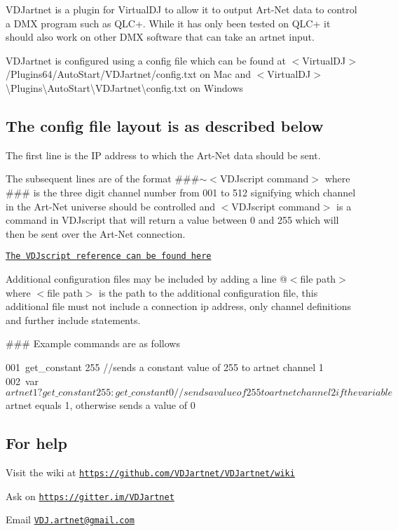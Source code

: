 V\+D\+Jartnet is a plugin for Virtual\+DJ to allow it to output Art-\/\+Net data to control a D\+MX program such as Q\+L\+C+. While it has only been tested on Q\+L\+C+ it should also work on other D\+MX software that can take an artnet input.

V\+D\+Jartnet is configured using a config file which can be found at $<$Virtual\+DJ$>$/\+Plugins64/\+Auto\+Start/\+V\+D\+Jartnet/config.txt on Mac and $<$Virtual\+DJ$>$\textbackslash{}Plugins\textbackslash{}Auto\+Start\textbackslash{}V\+D\+Jartnet\textbackslash{}config.\+txt on Windows

\subsection*{The config file layout is as described below}

The first line is the IP address to which the Art-\/\+Net data should be sent.

The subsequent lines are of the format \#\#\#$\sim$$<$V\+D\+Jscript command$>$ where \#\#\# is the three digit channel number from 001 to 512 signifying which channel in the Art-\/\+Net universe should be controlled and $<$V\+D\+Jscript command$>$ is a command in V\+D\+Jscript that will return a value between 0 and 255 which will then be sent over the Art-\/\+Net connection.

\href{https://www.virtualdj.com/wiki/VDJscript.html}{\tt The V\+D\+Jscript reference can be found here}

Additional configuration files may be included by adding a line @$<$file path$>$ where $<$file path$>$ is the path to the additional configuration file, this additional file must not include a connection ip address, only channel definitions and further include statements.

\#\#\# Example commands are as follows 
\begin{DoxyCode}
001~get\_constant 255
//sends a constant value of 255 to artnet channel 1
002~var $artnet 1 ? get\_constant 255 : get\_constant 0
//sends a value of 255 to artnet channel 2 if the variable $artnet equals 1, otherwise sends a value of 0
\end{DoxyCode}
 \subsection*{For help}


\begin{DoxyItemize}
\item Visit the wiki at \href{https://github.com/VDJartnet/VDJartnet/wiki}{\tt https\+://github.\+com/\+V\+D\+Jartnet/\+V\+D\+Jartnet/wiki}
\item Ask on \href{https://gitter.im/VDJartnet}{\tt https\+://gitter.\+im/\+V\+D\+Jartnet}
\item Email \href{mailto:VDJ.artnet@gmail.com}{\tt V\+D\+J.\+artnet@gmail.\+com} 
\end{DoxyItemize}